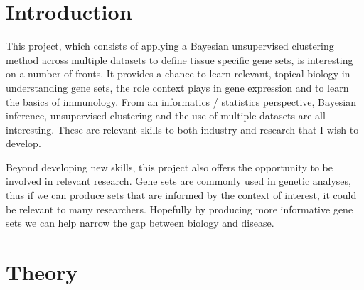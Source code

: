 \documentclass[12pt]{article} %
\begin{document}
	
	\section{Introduction}
	This project, which consists of applying a Bayesian unsupervised clustering method across multiple datasets to define tissue specific gene sets, is interesting on a number of fronts. It provides a chance to learn relevant, topical biology in understanding gene sets, the role context plays in gene expression and to learn the basics of immunology. From an informatics / statistics perspective, Bayesian inference, unsupervised clustering and the use of multiple datasets are all interesting. These are relevant skills to both industry and research that I wish to develop.
	
	Beyond developing new skills, this project also offers the opportunity to be involved in relevant research. Gene sets are commonly used in genetic analyses, thus if we can produce sets that are informed by the context of interest, it could be relevant to many researchers. Hopefully by producing more informative gene sets we can help narrow the gap between biology and disease.	

	\section{Theory}
\end{document}
